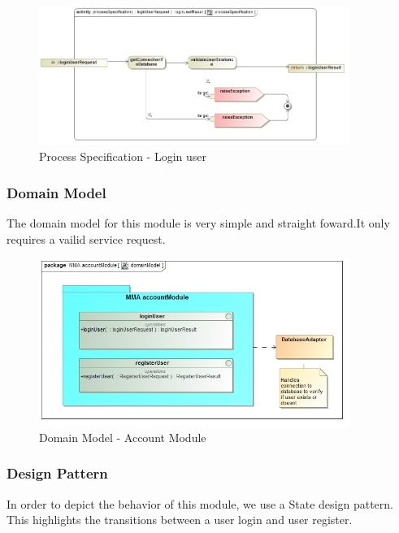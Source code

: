 \documentclass[hidelinks, 12pt, oneside]{article}
\begin{document}
		
		\begin{figure}[!htbp]
    		\centering
    		\includegraphics[width=0.9\textwidth]{img/processSpecificationLoginUser.jpg}
    		\caption{Process Specification - Login user}
    		\label{fig:ProcessSpec_loginUser}
		\end{figure}
		\newpage
		
		\subsubsection{Domain Model}
		The domain model for this module is very simple and straight foward.It only requires a vailid service request.
		
		
		\begin{figure}[!htbp]
    		\centering
    		\includegraphics[width=0.9\textwidth]{img/DomainModelAccountModule.jpg}
    		\caption{Domain Model - Account Module}
    		\label{fig:DomainMod_accountModule}
		\end{figure}
		\newpage
				
		\subsubsection{Design Pattern}
		In order to depict the behavior of this module, we use a State design pattern. This highlights the transitions 
		between a user login and user register.
		
\end{document}
